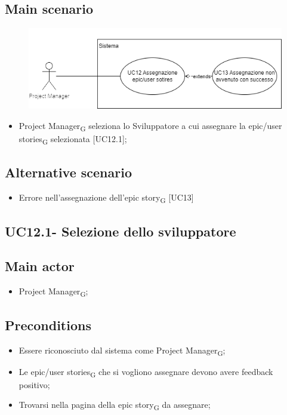 \documentclass{article}
\begin{document}
    \subsection*{Main scenario}
        \begin{figure}[h]
          \centering
          \includegraphics{./imgUML/UC12-zoom.png}
          \label{fig:immagine}
        \end{figure}
        
        \begin{itemize}
            \item Project Manager\textsubscript{G} seleziona lo Sviluppatore a cui assegnare la epic/user stories\textsubscript{G} selezionata [UC12.1];
        \end{itemize}
        
    \subsection*{Alternative scenario}
        \begin{itemize}
            \item Errore nell'assegnazione dell'epic story\textsubscript{G} [UC13]
        \end{itemize}    
        
    \subsection{UC12.1- Selezione dello sviluppatore}
        \subsection*{Main actor}
    \begin{itemize}
        \item Project Manager\textsubscript{G};
    \end{itemize}
    
    \subsection*{Preconditions}
        \begin{itemize}
            \item Essere riconosciuto dal sistema come Project Manager\textsubscript{G};
            \item Le epic/user stories\textsubscript{G} che si vogliono assegnare devono avere feedback positivo;
            \item Trovarsi nella pagina della epic story\textsubscript{G} da assegnare;
        \end{itemize}
        
\end{document}
